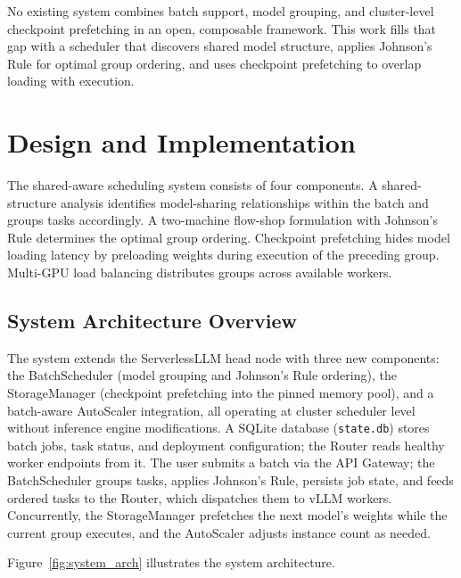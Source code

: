 \documentclass[logo,bsc,singlespacing,parskip,online]{infthesis}
\begin{document}
No existing system combines batch support, model grouping, and cluster-level checkpoint prefetching in an open, composable framework. This work fills that gap with a scheduler that discovers shared model structure, applies Johnson's Rule for optimal group ordering, and uses checkpoint prefetching to overlap loading with execution.





\chapter{Design and Implementation}

The shared-aware scheduling system consists of four components. A shared-structure analysis identifies model-sharing relationships within the batch and groups tasks accordingly. A two-machine flow-shop formulation with Johnson's Rule determines the optimal group ordering. Checkpoint prefetching hides model loading latency by preloading weights during execution of the preceding group. Multi-GPU load balancing distributes groups across available workers.

\section{System Architecture Overview}

The system extends the ServerlessLLM head node with three new components: the BatchScheduler (model grouping and Johnson's Rule ordering), the StorageManager (checkpoint prefetching into the pinned memory pool), and a batch-aware AutoScaler integration, all operating at cluster scheduler level without inference engine modifications. A SQLite database (\texttt{state.db}) stores batch jobs, task status, and deployment configuration; the Router reads healthy worker endpoints from it. The user submits a batch via the API Gateway; the BatchScheduler groups tasks, applies Johnson's Rule, persists job state, and feeds ordered tasks to the Router, which dispatches them to vLLM workers. Concurrently, the StorageManager prefetches the next model's weights while the current group executes, and the AutoScaler adjusts instance count as needed.

Figure~\ref{fig:system_arch} illustrates the system architecture.
\end{document}
